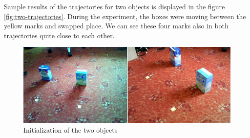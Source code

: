 Sample results of the trajectories for two objects is displayed in the figure
\ref{fig:two-trajectories}. During the experiment, the boxes were moving
between the yellow marks and swapped place. We can see these four marks also in
both trajectories quite close to each other. 

\begin{figure}
\includegraphics[width=\linewidth]{img/experiments/two-objects.png}
\caption{Initialization of the two objects}
\label{fig:two-init}
\end{figure}

